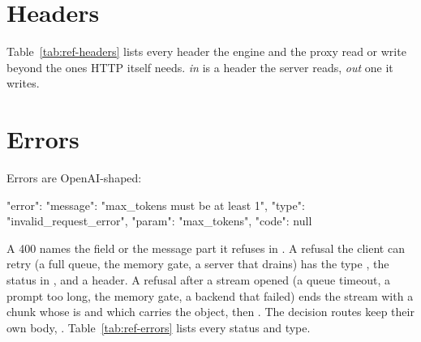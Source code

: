 \section{Headers}

Table~\ref{tab:ref-headers} lists every header the engine and the proxy read or write beyond the ones HTTP itself needs. \emph{in} is a header the server reads, \emph{out} one it writes.



\section{Errors}

Errors are OpenAI-shaped:

\begin{jsonc}
{"error": {"message": "max_tokens must be at least 1", "type": "invalid_request_error",
           "param": "max_tokens", "code": null}}
\end{jsonc}

A 400 names the field or the message part it refuses in . A refusal the client can retry (a full queue, the memory gate, a server that drains) has the type , the status in , and a  header. A refusal after a stream opened (a queue timeout, a prompt too long, the memory gate, a backend that failed) ends the stream with a chunk whose  is  and which carries the  object, then \code{[DONE]}. The decision routes keep their own body, . Table~\ref{tab:ref-errors} lists every status and type.


